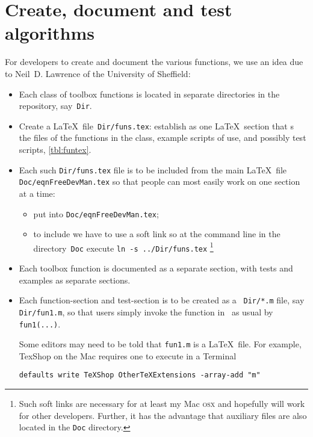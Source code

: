 \chapter{Create, document and test algorithms}
\label{sec:contribute}
\secttoc
\def\LaTeX{LaTeX}%

For developers to create and document the various functions, we use an idea due to Neil~D. Lawrence of the University of Sheffield:

\begin{itemize}
\item Each class of toolbox functions is located in separate directories in the repository, say~\verb|Dir|.

\item Create a \LaTeX\ file~\verb|Dir/funs.tex|: establish as one \LaTeX\ section that \verb||s the  files of the functions in the class, example scripts of use, and possibly test scripts, \autoref{tbl:funtex}.

\item Each such \verb|Dir/funs.tex| file is to be included from the main \LaTeX\ file \verb|Doc/eqnFreeDevMan.tex| so that people can most easily work on one section at a time: 
\begin{itemize}
\item put \verb|| into \verb|Doc/eqnFreeDevMan.tex|;
\item to include we have to use a soft link so at the command line in the directory~\verb|Doc| execute \verb|ln -s ../Dir/funs.tex|
\footnote{Such soft links are necessary for at least my Mac \textsc{osx} and hopefully will work for other developers.  Further, it has the advantage that auxiliary files are also located in the \texttt{Doc} directory.}
\end{itemize}


\item Each toolbox function is documented as a separate section, with tests and examples as separate sections.

\item Each function-section and test-section is to be created as a \script\ \verb|Dir/*.m| file, say \verb|Dir/fun1.m|, so that users simply invoke the function in \script\ as usual by \verb|fun1(...)|.

Some editors may need to be told that \verb|fun1.m| is a \LaTeX\ file.  For example, TexShop on the Mac requires one to execute in a Terminal
\begin{verbatim}
defaults write TeXShop OtherTeXExtensions -array-add "m"
\end{verbatim}


\end{itemize}
